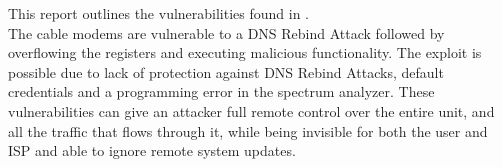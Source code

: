 This report outlines the \exploitname{} vulnerabilities found in \product. \bigskip \\
The cable modems are vulnerable to a DNS Rebind Attack followed by overflowing the registers and executing malicious functionality.
The exploit is possible due to lack of protection against DNS Rebind Attacks, default credentials and a programming error in the spectrum analyzer.
These vulnerabilities can give an attacker full remote control over the entire unit, and all the traffic that flows through it, while being invisible for both the user and ISP and able to ignore remote system updates.